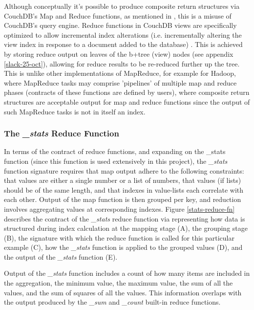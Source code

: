 Although conceptually it's possible to produce composite return structures via CouchDB's Map and Reduce functions, as mentioned in \cite{reduceFunctions}, this is a misuse of CouchDB's query engine. Reduce functions in CouchDB views are specifically optimized to allow incremental index alterations (i.e. incrementally altering the view index in response to a document added to the database) \cite{reduceFunctions}. This is achieved by storing reduce output on leaves of the b+tree (view) nodes (see appendix \ref{slack-25-oct}), allowing for reduce results to be re-reduced further up the tree. This is unlike other implementations of MapReduce, for example for Hadoop, where MapReduce tasks may comprise 'pipelines' of multiple map and reduce phases (contracts of these functions are defined by users), where composite return structures are acceptable output for map and reduce functions since the output of such MapReduce tasks is not in itself an index.

\subsubsection{The \textit{\_stats} Reduce Function}
In terms of the contract of reduce functions, and expanding on the \_stats function (since this function is used extensively in this project), the \textit{\_stats} function signature requires that map output adhere to the following constraints: that values are either a single number or a list of numbers, that values (if lists) should be of the same length, and that indexes in value-lists each correlate with each other. Output of the map function is then grouped per key, and reduction involves aggregating values at corresponding indexes. Figure \ref{stats-reduce-fn} describes the contract of the \textit{\_stats} reduce function via representing how data is structured during index calculation at the mapping stage (A), the grouping stage (B), the signature with which the reduce function is called for this particular example (C), how the \textit{\_stats} function is applied to the grouped values (D), and the output of the \textit{\_stats} function (E).

Output of the \textit{\_stats} function includes a count of how many items are included in the aggregation, the minimum value, the maximum value, the sum of all the values, and the sum of squares of all the values. This information overlaps with the output produced by the \textit{\_sum} and \textit{\_count} built-in reduce functions.

